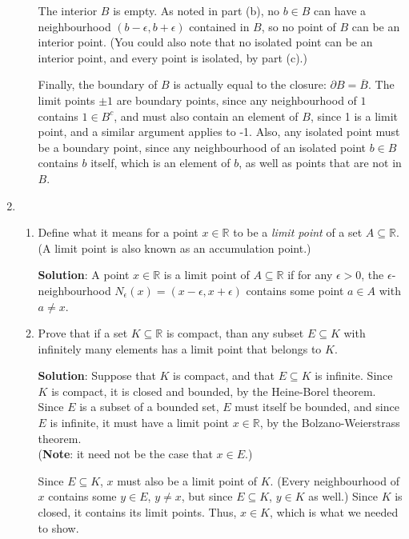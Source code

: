 \documentclass[12pt]{article}
\newcommand{\points}[1]{\marginpar{\hspace{24pt}[#1]}}
\newcommand{\R}{\mathbb{R}}
\begin{document}
\begin{enumerate}
\begin{enumerate}
The interior $B$ is empty. As noted in part (b), no $b\in B$ can have a neighbourhood $(b-\epsilon,b+\epsilon)$ contained in $B$, so no point of $B$ can be an interior point. (You could also note that no isolated point can be an interior point, and every point is isolated, by part (c).)

Finally, the boundary of $B$ is actually equal to the closure: $\partial B = \overline{B}$. The limit points $\pm 1$ are boundary points, since any neighbourhood of $1$ contains $1\in B^c$, and must also contain an element of $B$, since 1 is a limit point, and a similar argument applies to -1. Also, any isolated point must be a boundary point, since any neighbourhood of an isolated point $b\in B$ contains  $b$ itself, which is an element of $b$, as well as points that are not in $B$.

\end{enumerate}
\newpage
\item \begin{enumerate}
       \item Define what it means for a point $x\in\R$ to be a {\em limit point} of a set $A\subseteq \R$. (A limit point is also known as an accumulation point.) \points{3}


\bigskip

{\bf Solution}: A point $x\in \R$ is a limit point of $A\subseteq \R$ if for any $\epsilon>0$, the $\epsilon$-neighbourhood $N_\epsilon(x) = (x-\epsilon, x+\epsilon)$ contains some point $a\in A$ with $a\neq x$.

\bigskip

      \item Prove that if a set $K\subseteq \R$ is compact, than any subset $E\subseteq K$ with infinitely many elements has a limit point that belongs to $K$. \points{7}


\bigskip

{\bf Solution}: Suppose that $K$ is compact, and that $E\subseteq K$ is infinite. Since $K$ is compact, it is closed and bounded, by the Heine-Borel theorem. Since $E$ is a subset of a bounded set, $E$ must itself be bounded, and since $E$ is infinite, it must have a limit point $x\in\R$, by the Bolzano-Weierstrass theorem.\\
({\bf Note}: it need not be the case that $x\in E$.)

Since $E\subseteq K$, $x$ must also be a limit point of $K$. (Every neighbourhood of $x$ contains some $y\in E$, $y\neq x$, but since $E\subseteq K$, $y\in K$ as well.) Since $K$ is closed, it contains its limit points. Thus, $x\in K$, which is what we needed to show.
      \end{enumerate}
\newpage


\end{enumerate}
\end{document}
